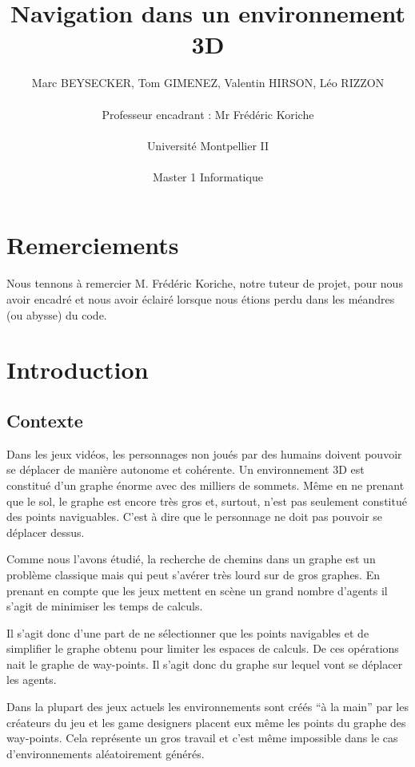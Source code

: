 \documentclass[a4paper,12pt]{report}
\title{Navigation dans un environnement 3D \vspace{0.5cm}}
\author{Marc BEYSECKER, Tom GIMENEZ, Valentin HIRSON, Léo RIZZON\\  \\Professeur encadrant : Mr Frédéric Koriche \\ \\Université Montpellier II \\  \\Master 1 Informatique}
\date{}
\begin{document}
\maketitle

\tableofcontents

\newpage

\chapter*{Remerciements}

Nous tennons à remercier M. Frédéric Koriche, notre tuteur de projet, pour nous avoir encadré et nous avoir éclairé lorsque nous étions perdu dans les méandres (ou abysse) du code.  

\chapter{Introduction}


\section*{Contexte}

Dans les jeux vidéos, les personnages non joués par des humains doivent pouvoir se déplacer de manière autonome et cohérente. Un environnement 3D est constitué d'un graphe énorme avec des milliers de sommets. Même en ne prenant que le sol, le graphe est encore très gros et, surtout, n'est pas seulement constitué des points naviguables. C'est à dire que le personnage ne doit pas pouvoir se déplacer dessus.

Comme nous l'avons étudié, la recherche de chemins dans un graphe est un problème classique mais qui peut s'avérer très lourd sur de gros graphes. En prenant en compte que les jeux mettent en scène un grand nombre d'agents il s'agit de minimiser les temps de calculs. 

Il s'agit donc d'une part de ne sélectionner que les points navigables et de simplifier le graphe obtenu pour limiter les espaces de calculs. De ces opérations nait le graphe de way-points. Il s'agit donc du graphe sur lequel vont se déplacer les agents.

Dans la plupart des jeux actuels les environnements sont créés ``à la main'' par les créateurs du jeu et les game designers placent eux même les points du graphe des way-points. Cela représente un gros travail et c'est même impossible dans le cas d'environnements aléatoirement générés.
\end{document}
